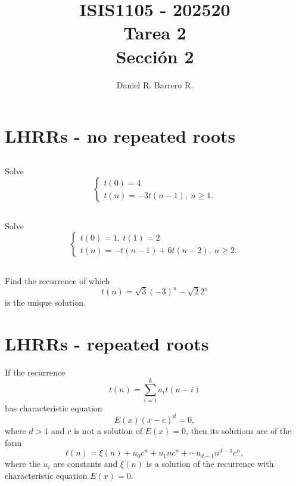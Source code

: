 \documentclass{amsart}
\title{ISIS1105 - 202520\\ Tarea 2\\ Sección 2}
\author{Daniel R. Barrero R.}
\begin{document}
\maketitle

\section{LHRRs - no repeated roots}

%

\subsection{} Solve
\begin{displaymath}
	\begin{cases}
		t(0)= 4\\
		t(n)= -3t(n-1),\ n \geq 1.
	\end{cases}
\end{displaymath}

%

\subsection{} Solve
\begin{displaymath}
	\begin{cases}
		t(0)= 1,\ t(1)= 2\\
		t(n)= -t(n-1) + 6t(n-2),\ n \geq 2.
	\end{cases}
\end{displaymath}

%

\subsection{} Find the recurrence of which
\[
	t(n)= \sqrt{3}(-3)^n - \sqrt{2}2^n
\]
is the unique solution.

\section{LHRRs - repeated roots}
\begin{thm}\label{hrep}
	If the recurrence
	\[
		t(n)= \sum_{i= 1}^k a_i t(n-i)
	\]
	has characteristic equation
	\[
		E(x)(x-c)^d= 0,
	\]
	where $d > 1$ and $c$ is not a solution of $E(x)= 0$, then its solutions
	are of the form
	\[
		t(n) = \xi(n) + u_0c^n + u_1nc^n + \cdots u_{d-1}n^{d-1}c^n,
	\]
	where the $u_i$ are constants and $\xi(n)$ is a solution of the
	recurrence with characteristic equation $E(x)= 0$.
\end{thm}
\end{document}
